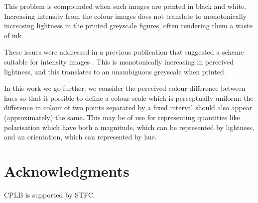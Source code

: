 \documentclass[useAMS,usedcolumn,usegraphicx,usenatbib]{mn2e}
\begin{document}
This problem is compounded when such images are printed in black and white. Increasing intensity from the colour images does not translate to monotonically increasing lightness in the printed greyscale figures, often rendering them a waste of ink.

These issues were addressed in a previous publication that suggested a scheme suitable for intensity images \cite{Green2011}. This is monotonically increasing in perceived lightness, and this translates to an unambiguous greyscale when printed.

In this work we go further; we consider the perceived colour difference between hues so that it possible to define a colour scale which is perceptually uniform: the difference in colour of two points separated by a fixed interval should also appear (approximately) the same. This may be of use for representing quantities like polarisation which have both a magnitude, which can be represented by lightness, and an orientation, which can represented by hue.


\section*{Acknowledgments}

CPLB is supported by STFC.




\appendix



\bsp

\label{lastpage}
\end{document}
